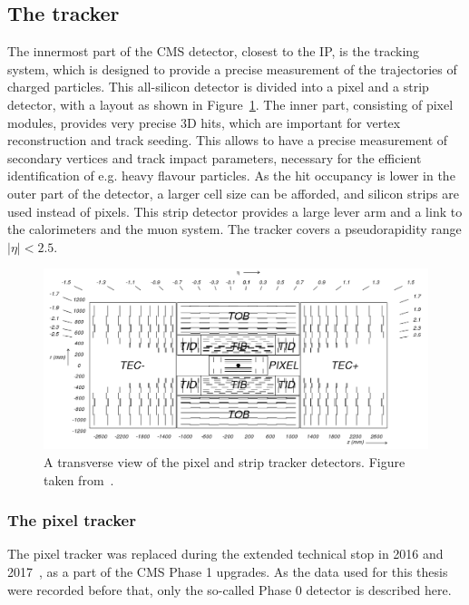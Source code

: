 \subsection{The tracker}

The innermost part of the \ac{CMS} detector, closest to the \ac{IP}, is the tracking system, which is designed to provide a precise measurement of the trajectories of charged particles. This all-silicon detector is divided into a pixel and a strip detector, with a layout as shown in Figure~\ref{fig:cmstracker}. The inner part, consisting of pixel modules, provides very precise 3D hits, which are important for vertex reconstruction and track seeding. This allows to have a precise measurement of secondary vertices and track impact parameters, necessary for the efficient identification of e.g. heavy flavour particles. As the hit occupancy is lower in the outer part of the detector, a larger cell size can be afforded, and silicon strips are used instead of pixels. This strip detector provides a large lever arm and a link to the calorimeters and the muon system. The tracker covers a pseudorapidity range $|\eta| < 2.5$.

\begin{figure}[ht]
  \centering
 \includegraphics[width=\textwidth]{fig_cmstracker}
 \caption{A transverse view of the pixel and strip tracker detectors. Figure taken from~\cite{Chatrchyan:2008aa}.}
 \label{fig:cmstracker}
\end{figure}

\subsubsection{The pixel tracker} 

The pixel tracker was replaced during the extended technical stop in 2016 and 2017~\cite{CMS:2012sda}, as a part of the \ac{CMS} Phase 1 upgrades. As the data used for this thesis were recorded before that, only the so-called Phase 0 detector is described here. 

